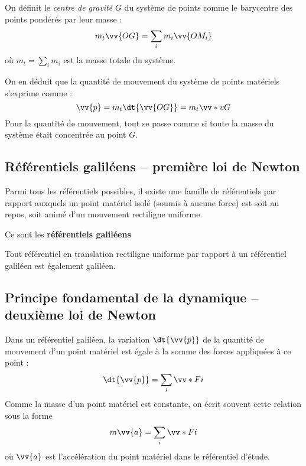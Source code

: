 \documentclass{cours}
\begin{document}
On définit le \emph{centre de gravité} $G$ du système de points comme le barycentre des points pondérés par leur masse :
\begin{equation}
m_t \vv{OG} = \sum_i m_i \vv{OM_i} 
\end{equation}
où $m_t = \sum_i m_i$ est la masse totale du système.

On en déduit que la quantité de mouvement du système de points matériels s'exprime comme :
\begin{equation}
\vv{p} = m_t  \dt{\vv{OG}} = m_t \vv*{v}{G}
\end{equation}
Pour la quantité de mouvement, tout se passe comme si toute la masse du système était concentrée au point $G$. 

\subsection{Référentiels galiléens -- première loi de Newton }%
\label{sub:referentiels_galileens}
\begin{definition}
Parmi tous les référentiels possibles, il existe une famille de référentiels par rapport auxquels un point matériel isolé (soumis à aucune force) est soit au repos, soit animé d'un mouvement rectiligne uniforme.

Ce sont les \textbf{référentiels galiléens} 
\end{definition}

Tout référentiel en translation rectiligne uniforme par rapport à un référentiel galiléen est également galiléen.

\subsection{Principe fondamental de la dynamique -- deuxième loi de Newton}%
\label{sub:principe_fondamental_de_la_dynamique_deuxieme_loi_de_newton}

Dans un référentiel galiléen, la variation $\dt{\vv{p}}$ de la quantité de mouvement d'un point matériel est égale à la somme des forces appliquées à ce point :
\begin{equation}
\dt{\vv{p}} = \sum_i \vv*{F}{i}
\end{equation}
Comme la masse d'un point matériel est constante, on écrit souvent cette relation sous la forme
\begin{equation}
m \vv{a} = \sum_i \vv*{F}{i}
\end{equation}
où $\vv{a}$ est l'accélération du point matériel dans le référentiel d'étude.
\end{document}
